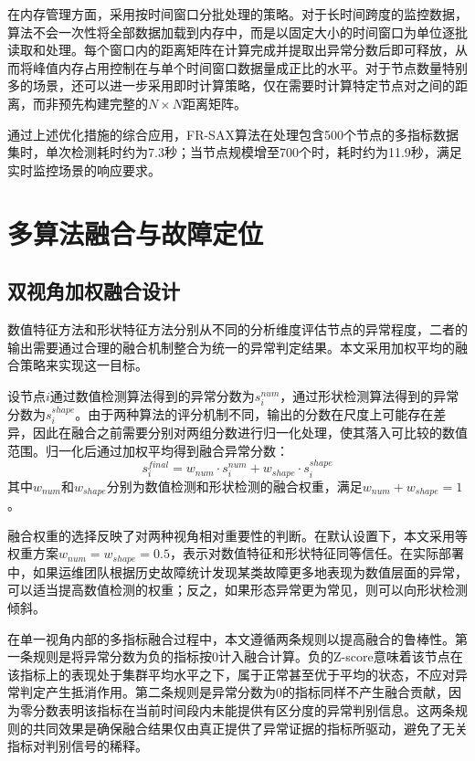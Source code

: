 在内存管理方面，采用按时间窗口分批处理的策略。对于长时间跨度的监控数据，算法不会一次性将全部数据加载到内存中，而是以固定大小的时间窗口为单位逐批读取和处理。每个窗口内的距离矩阵在计算完成并提取出异常分数后即可释放，从而将峰值内存占用控制在与单个时间窗口数据量成正比的水平。对于节点数量特别多的场景，还可以进一步采用即时计算策略，仅在需要时计算特定节点对之间的距离，而非预先构建完整的$N \times N$距离矩阵。

通过上述优化措施的综合应用，FR-SAX算法在处理包含500个节点的多指标数据集时，单次检测耗时约为7.3秒；当节点规模增至700个时，耗时约为11.9秒，满足实时监控场景的响应要求。

\section{多算法融合与故障定位}

\subsection{双视角加权融合设计}

数值特征方法和形状特征方法分别从不同的分析维度评估节点的异常程度，二者的输出需要通过合理的融合机制整合为统一的异常判定结果。本文采用加权平均的融合策略来实现这一目标。

设节点$i$通过数值检测算法得到的异常分数为$s_i^{num}$，通过形状检测算法得到的异常分数为$s_i^{shape}$。由于两种算法的评分机制不同，输出的分数在尺度上可能存在差异，因此在融合之前需要分别对两组分数进行归一化处理，使其落入可比较的数值范围。归一化后通过加权平均得到融合异常分数：
\begin{equation}
    s_i^{final} = w_{num} \cdot s_i^{num} + w_{shape} \cdot s_i^{shape}
\end{equation}
其中$w_{num}$和$w_{shape}$分别为数值检测和形状检测的融合权重，满足$w_{num} + w_{shape} = 1$。

融合权重的选择反映了对两种视角相对重要性的判断。在默认设置下，本文采用等权重方案$w_{num} = w_{shape} = 0.5$，表示对数值特征和形状特征同等信任。在实际部署中，如果运维团队根据历史故障统计发现某类故障更多地表现为数值层面的异常，可以适当提高数值检测的权重；反之，如果形态异常更为常见，则可以向形状检测倾斜。

在单一视角内部的多指标融合过程中，本文遵循两条规则以提高融合的鲁棒性。第一条规则是将异常分数为负的指标按0计入融合计算。负的Z-score意味着该节点在该指标上的表现处于集群平均水平之下，属于正常甚至优于平均的状态，不应对异常判定产生抵消作用。第二条规则是异常分数为0的指标同样不产生融合贡献，因为零分数表明该指标在当前时间段内未能提供有区分度的异常判别信息。这两条规则的共同效果是确保融合结果仅由真正提供了异常证据的指标所驱动，避免了无关指标对判别信号的稀释。

